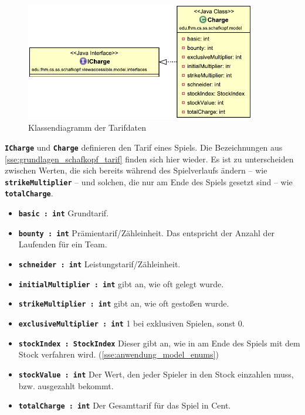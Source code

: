\documentclass[
							a4paper, 
							11pt, 
							openany, 
							liststotoc,
							parskip=half, 
   							headings=normal
						]{scrreprt}
\begin{document}
{\begin{figure}[H]
\begin{center}
    \includegraphics[width=0.9\textwidth]{./pictures/uml/class_diagram/uml_class_charge.pdf}
	\caption[Anwendung/Model -- Klassendiagramm Tarifdaten]{Klassendiagramm der Tarifdaten} \label{fig:model_charge}
\end{center}
\end{figure}

\textbf{\texttt{ICharge}} und \textbf{\texttt{Charge}} definieren den Tarif eines Spiels. Die Bezeichnungen aus \autoref{sse:grundlagen_schafkopf_tarif} finden sich hier wieder. Es ist zu unterscheiden zwischen Werten, die sich bereits während des Spielverlaufs ändern -- wie \textbf{\texttt{strikeMultiplier}} -- und solchen, die nur am Ende des Spiels gesetzt sind -- wie \textbf{\texttt{totalCharge}}.
\begin{itemize}
	\item \textbf{\texttt{basic : int}} Grundtarif.
	\item \textbf{\texttt{bounty : int}} Prämientarif/Zähleinheit. Das entspricht der Anzahl der Laufenden für ein Team.
	\item \textbf{\texttt{schneider : int}} Leistungstarif/Zähleinheit.
	\item \textbf{\texttt{initialMultiplier : int}} gibt an, wie oft gelegt wurde.
	\item \textbf{\texttt{strikeMultiplier : int}} gibt an, wie oft gestoßen wurde.
	\item \textbf{\texttt{exclusiveMultiplier : int}} 1 bei exklusiven Spielen, sonst 0.
	\item \textbf{\texttt{stockIndex : StockIndex}} Dieser gibt an, wie in am Ende des Spiels mit dem Stock verfahren wird. (\autoref{sse:anwendung_model_enums})
	\item \textbf{\texttt{stockValue : int}} Der Wert, den jeder Spieler in den Stock einzahlen muss, bzw. ausgezahlt bekommt.
	\item \textbf{\texttt{totalCharge : int}} Der Gesamttarif für das Spiel in Cent.	
\end{itemize}

}
\end{document}
